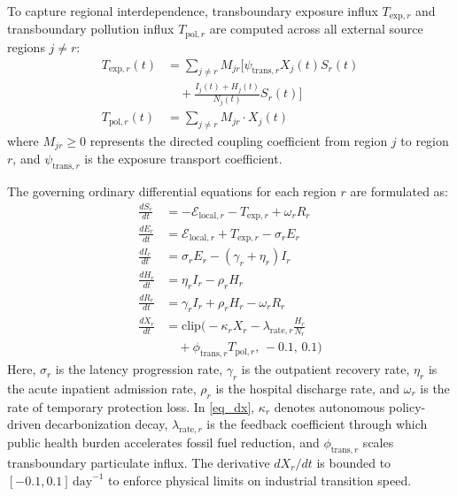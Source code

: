 \documentclass[conference]{IEEEtran}
\renewcommand{\_}{\textunderscore\allowbreak{}}%
\begin{document}
To capture regional interdependence, transboundary exposure influx $T_{\text{exp}, r}$ and transboundary pollution influx $T_{\text{pol}, r}$ are computed across all external source regions $j \neq r$:
\begin{align}
T_{\text{exp}, r}(t) &= \sum_{j \neq r} M_{jr} \bigg[ \psi_{\text{trans}, r} X_j(t) S_r(t) \nonumber \\
&\quad + \frac{I_j(t) + H_j(t)}{N_j(t)} S_r(t) \bigg] \label{eq_trans_exp} \\
T_{\text{pol}, r}(t) &= \sum_{j \neq r} M_{jr} \cdot X_j(t) \label{eq_trans_pol}
\end{align}
where $M_{jr} \ge 0$ represents the directed coupling coefficient from region $j$ to region $r$, and $\psi_{\text{trans}, r}$ is the exposure transport coefficient.

The governing ordinary differential equations for each region $r$ are formulated as:
\begin{align}
\frac{dS_r}{dt} &= -\mathcal{E}_{\text{local}, r} - T_{\text{exp}, r} + \omega_r R_r \label{eq_ds} \\
\frac{dE_r}{dt} &= \mathcal{E}_{\text{local}, r} + T_{\text{exp}, r} - \sigma_r E_r \label{eq_de} \\
\frac{dI_r}{dt} &= \sigma_r E_r - (\gamma_r + \eta_r) I_r \label{eq_di} \\
\frac{dH_r}{dt} &= \eta_r I_r - \rho_r H_r \label{eq_dh} \\
\frac{dR_r}{dt} &= \gamma_r I_r + \rho_r H_r - \omega_r R_r \label{eq_dr} \\
\frac{dX_r}{dt} &= \text{clip}\bigg( -\kappa_r X_r - \lambda_{\text{rate}, r} \frac{H_r}{N_r} \nonumber \\
&\quad + \phi_{\text{trans}, r} T_{\text{pol}, r}, \, -0.1, \, 0.1 \bigg) \label{eq_dx}
\end{align}
Here, $\sigma_r$ is the latency progression rate, $\gamma_r$ is the outpatient recovery rate, $\eta_r$ is the acute inpatient admission rate, $\rho_r$ is the hospital discharge rate, and $\omega_r$ is the rate of temporary protection loss. In \eqref{eq_dx}, $\kappa_r$ denotes autonomous policy-driven decarbonization decay, $\lambda_{\text{rate}, r}$ is the feedback coefficient through which public health burden accelerates fossil fuel reduction, and $\phi_{\text{trans}, r}$ scales transboundary particulate influx. The derivative $dX_r/dt$ is bounded to $[-0.1, 0.1]\,\text{day}^{-1}$ to enforce physical limits on industrial transition speed.
\end{document}
